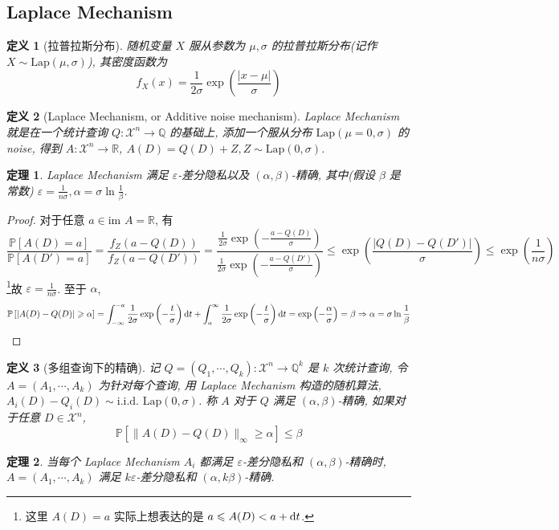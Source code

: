 \documentclass[8pt]{article}
\theoremstyle{compact}
\newtheorem{theorem}{定理}[section]
\newtheorem{definition}{定义}[section]
\def\le{\leqslant}
\def\ge{\geqslant}
\def\im{\text{im }}
\def\P#1{\mathbb{P}\left[{#1}\right]}
\begin{document}
\subsection{Laplace Mechanism}
\begin{definition}[拉普拉斯分布]
	随机变量 $X$ 服从参数为 $\mu, \sigma$ 的拉普拉斯分布(记作 $X \sim \text{Lap}(\mu, \sigma)$), 其密度函数为 $$f_X(x) = \frac{1}{2\sigma}\exp\left(\frac{|x-\mu|}{\sigma}\right)$$
\end{definition}
\begin{definition}[Laplace Mechanism, or Additive noise mechanism]
	Laplace Mechanism 就是在一个统计查询 $Q: \mathcal X^n \to \mathbb Q$ 的基础上, 添加一个服从分布 $\text{Lap}(\mu = 0, \sigma)$ 的noise, 得到 $A: \mathcal X^n \to \mathbb R$, $A(D) = Q(D) + Z, Z \sim \text{Lap}(0, \sigma)$.
\end{definition}
\begin{theorem}
	Laplace Mechanism 满足 $\varepsilon$-差分隐私以及 $(\alpha, \beta)$-精确, 其中(假设 $\beta$ 是常数) $\varepsilon = \frac{1}{n\sigma}, \alpha = \sigma \ln \frac{1}{\beta}$.
\end{theorem}
\begin{proof}
	对于任意 $a \in \im A = \mathbb R$, 有 $$\frac{\P{A(D) = a}}{\P{A(D') = a}} = \frac{f_Z(a - Q(D))}{f_Z(a - Q(D'))} = \frac{\frac{1}{2\sigma}\exp\left(-\frac{a-Q(D)}{\sigma}\right)}{\frac{1}{2\sigma}\exp\left(-\frac{a-Q(D')}{\sigma}\right)} \le \exp\left(\frac{|Q(D) - Q(D')|}{\sigma}\right) \le \exp\left(\frac{1}{n\sigma}\right)$$ \footnote{这里 $A(D) = a$ 实际上想表达的是 $a \le A(D) < a + \text dt$.}故 $\varepsilon = \frac{1}{n \sigma}$. 至于 $\alpha$, 
	$$\P{|A(D) - Q(D)| \ge \alpha} = \int_{-\infty}^{-a}\frac{1}{2\sigma}\exp\left(-\frac t{\sigma}\right)\text dt + \int_a^{\infty}\frac{1}{2\sigma}\exp\left(-\frac t{\sigma}\right)\text dt = \exp\left(-\frac{\alpha}{\sigma}\right) = \beta \Rightarrow \alpha = \sigma \ln \frac{1}{\beta}$$
\end{proof}
\begin{definition}[多组查询下的精确]
	记 $Q = (Q_1, \cdots, Q_k): \mathcal X^n \to \mathbb Q^k$ 是 $k$ 次统计查询, 令 $A = (A_1, \cdots, A_k)$ 为针对每个查询, 用 Laplace Mechanism 构造的随机算法, $A_i(D) - Q_i(D) \sim \text{i.i.d. } \text{Lap}(0, \sigma)$. 称 $A$ 对于 $Q$ 满足 $(\alpha, \beta)$-精确, 如果对于任意 $D \in \mathcal X^n$, $$\P{\|A(D) - Q(D)\|_{\infty} \ge \alpha} \le \beta$$
\end{definition}
\begin{theorem}
	当每个 Laplace Mechanism $A_i$ 都满足 $\varepsilon$-差分隐私和 $(\alpha, \beta)$-精确时, $A = (A_1, \cdots, A_k)$ 满足 $k\varepsilon$-差分隐私和 $(\alpha, k\beta)$-精确.
\end{theorem}
\end{document}
